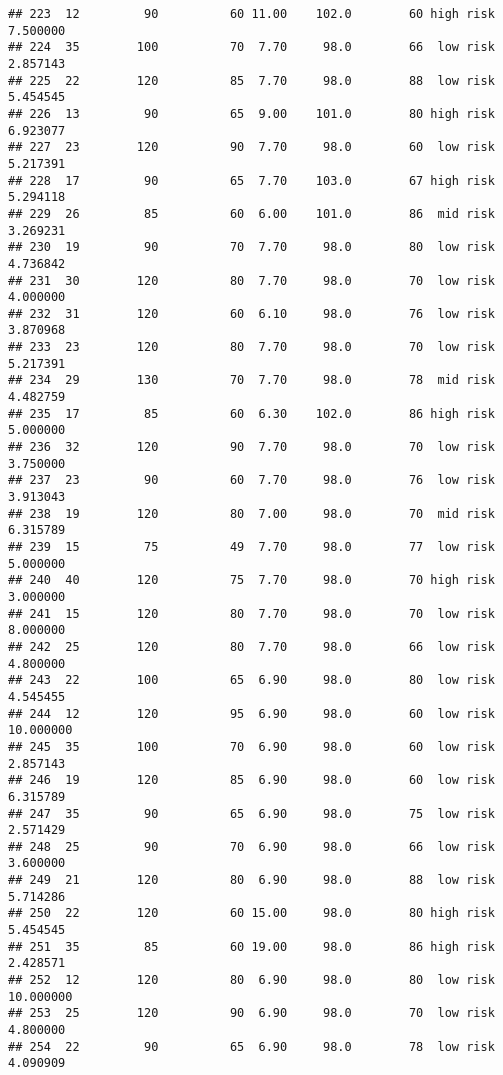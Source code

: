 \documentclass[
  ignorenonframetext,
]{beamer}
\begin{document}
\begin{frame}[fragile]
\begin{verbatim}
## 223  12         90          60 11.00    102.0        60 high risk      7.500000
## 224  35        100          70  7.70     98.0        66  low risk      2.857143
## 225  22        120          85  7.70     98.0        88  low risk      5.454545
## 226  13         90          65  9.00    101.0        80 high risk      6.923077
## 227  23        120          90  7.70     98.0        60  low risk      5.217391
## 228  17         90          65  7.70    103.0        67 high risk      5.294118
## 229  26         85          60  6.00    101.0        86  mid risk      3.269231
## 230  19         90          70  7.70     98.0        80  low risk      4.736842
## 231  30        120          80  7.70     98.0        70  low risk      4.000000
## 232  31        120          60  6.10     98.0        76  low risk      3.870968
## 233  23        120          80  7.70     98.0        70  low risk      5.217391
## 234  29        130          70  7.70     98.0        78  mid risk      4.482759
## 235  17         85          60  6.30    102.0        86 high risk      5.000000
## 236  32        120          90  7.70     98.0        70  low risk      3.750000
## 237  23         90          60  7.70     98.0        76  low risk      3.913043
## 238  19        120          80  7.00     98.0        70  mid risk      6.315789
## 239  15         75          49  7.70     98.0        77  low risk      5.000000
## 240  40        120          75  7.70     98.0        70 high risk      3.000000
## 241  15        120          80  7.70     98.0        70  low risk      8.000000
## 242  25        120          80  7.70     98.0        66  low risk      4.800000
## 243  22        100          65  6.90     98.0        80  low risk      4.545455
## 244  12        120          95  6.90     98.0        60  low risk     10.000000
## 245  35        100          70  6.90     98.0        60  low risk      2.857143
## 246  19        120          85  6.90     98.0        60  low risk      6.315789
## 247  35         90          65  6.90     98.0        75  low risk      2.571429
## 248  25         90          70  6.90     98.0        66  low risk      3.600000
## 249  21        120          80  6.90     98.0        88  low risk      5.714286
## 250  22        120          60 15.00     98.0        80 high risk      5.454545
## 251  35         85          60 19.00     98.0        86 high risk      2.428571
## 252  12        120          80  6.90     98.0        80  low risk     10.000000
## 253  25        120          90  6.90     98.0        70  low risk      4.800000
## 254  22         90          65  6.90     98.0        78  low risk      4.090909

\end{verbatim}
\end{frame}
\end{document}
